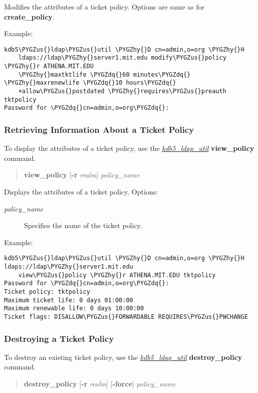\documentclass[letterpaper,10pt,english]{sphinxmanual}
\def\PYGZus{\char`\_}
\def\PYGZhy{\char`\-}
\def\PYGZdq{\char`\"}
\begin{document}
Modifies the attributes of a ticket policy.  Options are same as for
\textbf{create\_policy}.

Example:

\begin{Verbatim}[commandchars=\\\{\}]
kdb5\PYGZus{}ldap\PYGZus{}util \PYGZhy{}D cn=admin,o=org \PYGZhy{}H
    ldaps://ldap\PYGZhy{}server1.mit.edu modify\PYGZus{}policy \PYGZhy{}r ATHENA.MIT.EDU
    \PYGZhy{}maxtktlife \PYGZdq{}60 minutes\PYGZdq{} \PYGZhy{}maxrenewlife \PYGZdq{}10 hours\PYGZdq{}
    +allow\PYGZus{}postdated \PYGZhy{}requires\PYGZus{}preauth tktpolicy
Password for \PYGZdq{}cn=admin,o=org\PYGZdq{}:
\end{Verbatim}


\subsubsection{Retrieving Information About a Ticket Policy}
\label{admin/database:retrieving-information-about-a-ticket-policy}
To display the attributes of a ticket policy, use the
{\hyperref[admin/admin_commands/kdb5_ldap_util:kdb5-ldap-util-8]{\emph{kdb5\_ldap\_util}}} \textbf{view\_policy} command.
\begin{quote}

\textbf{view\_policy}
{[}\textbf{-r} \emph{realm}{]}
\emph{policy\_name}
\end{quote}

Displays the attributes of a ticket policy.  Options:
\begin{description}
\item[{\emph{policy\_name}}] \leavevmode
Specifies the name of the ticket policy.

\end{description}

Example:

\begin{Verbatim}[commandchars=\\\{\}]
kdb5\PYGZus{}ldap\PYGZus{}util \PYGZhy{}D cn=admin,o=org \PYGZhy{}H ldaps://ldap\PYGZhy{}server1.mit.edu
    view\PYGZus{}policy \PYGZhy{}r ATHENA.MIT.EDU tktpolicy
Password for \PYGZdq{}cn=admin,o=org\PYGZdq{}:
Ticket policy: tktpolicy
Maximum ticket life: 0 days 01:00:00
Maximum renewable life: 0 days 10:00:00
Ticket flags: DISALLOW\PYGZus{}FORWARDABLE REQUIRES\PYGZus{}PWCHANGE
\end{Verbatim}


\subsubsection{Destroying a Ticket Policy}
\label{admin/database:destroying-a-ticket-policy}
To destroy an existing ticket policy, use the {\hyperref[admin/admin_commands/kdb5_ldap_util:kdb5-ldap-util-8]{\emph{kdb5\_ldap\_util}}}
\textbf{destroy\_policy} command.
\begin{quote}

\textbf{destroy\_policy}
{[}\textbf{-r} \emph{realm}{]}
{[}\textbf{-force}{]}
\emph{policy\_name}
\end{quote}
\end{document}
